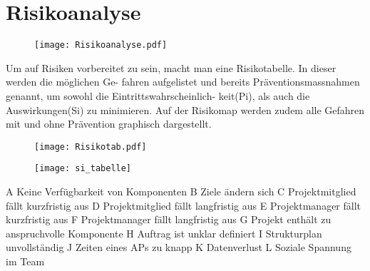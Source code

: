 \section{Risikoanalyse}
\begin{figure}[H]
	\centering
	\texttt{[image: Risikoanalyse.pdf]}
	\label{fig:Risikoanalyse}
\end{figure}

\newpage

Um auf Risiken vorbereitet zu sein, macht man eine Risikotabelle. In dieser werden die möglichen Ge- fahren aufgelistet und bereits Präventionsmassnahmen genannt, um sowohl die Eintrittswahrscheinlich- keit(Pi), als auch die Auswirkungen(Si) zu minimieren. Auf der Risikomap werden zudem alle Gefahren mit und ohne Prävention graphisch dargestellt.

\begin{figure}[H]
	\centering
	\texttt{[image: Risikotab.pdf]}
	\label{fig:Risikodiagramm}
\end{figure}

\begin{figure}[H]
	\centering
	\texttt{[image: si\_tabelle]}
	\label{fig:Tabelle}
\end{figure}
A Keine Verfügbarkeit von Komponenten
B Ziele ändern sich
C Projektmitglied fällt kurzfristig aus
D Projektmitglied fällt langfristig aus
E Projektmanager fällt kurzfristig aus
F Projektmanager fällt langfristig aus
G Projekt enthält zu anspruchvolle Komponente
H Auftrag ist unklar definiert
I Strukturplan unvollständig
J Zeiten eines APs zu knapp
K Datenverlust
L Soziale Spannung im Team
